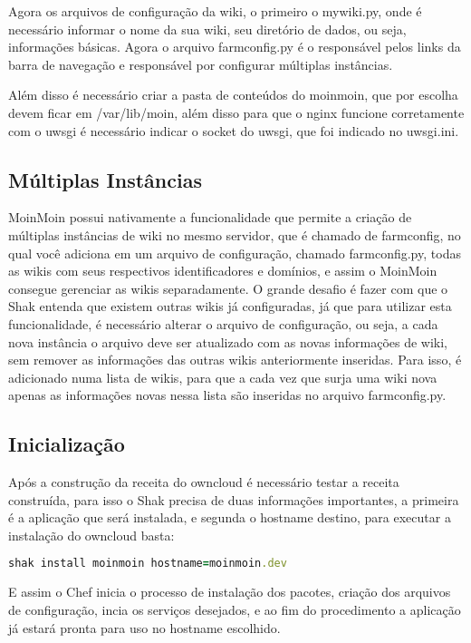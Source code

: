 Agora os arquivos de configuração da wiki, o primeiro o mywiki.py, onde é necessário
informar o nome da sua wiki, seu diretório de dados, ou seja, informações básicas.
Agora o arquivo farmconfig.py é o responsável pelos links da barra de navegação
e responsável por configurar múltiplas instâncias.

Além disso é necessário criar a pasta de conteúdos do moinmoin, que por
escolha devem ficar em /var/lib/moin, além disso para que o nginx funcione corretamente
com o uwsgi é necessário indicar o socket do uwsgi, que foi indicado no uwsgi.ini.

\subsection{Múltiplas Instâncias}

MoinMoin possui nativamente a funcionalidade
que permite a criação de múltiplas instâncias de wiki no mesmo servidor,
que é chamado de farmconfig, no qual você adiciona em um arquivo de configuração,
chamado farmconfig.py, todas as wikis com seus respectivos identificadores e domínios, e assim
o MoinMoin consegue gerenciar as wikis separadamente. O grande desafio é fazer
com que o Shak entenda que existem outras wikis já configuradas, já que para
utilizar esta funcionalidade,
é necessário alterar o arquivo de configuração, ou seja, a cada nova instância
o arquivo deve ser atualizado com as novas informações de wiki, sem remover as
informações das outras wikis anteriormente inseridas. Para isso, é adicionado
numa lista de wikis, para que a cada vez que surja uma wiki nova apenas as
informações novas nessa lista são inseridas no arquivo farmconfig.py.

\subsection{Inicialização}

Após a construção da receita do owncloud é necessário testar a receita construída,
para isso o Shak precisa de duas informações importantes, a primeira é a aplicação
que será instalada, e segunda o hostname destino, para executar a instalação
do owncloud basta:

\begin{lstlisting}[language=Ruby,label=dice_index,caption={Exemplo de execução de instalação do owncloud com shak}]
shak install moinmoin hostname=moinmoin.dev
\end{lstlisting}

E assim o Chef inicia o processo de instalação dos pacotes, criação dos arquivos
de configuração, incia os serviços desejados, e ao fim do procedimento a aplicação
já estará pronta para uso no hostname escolhido.

